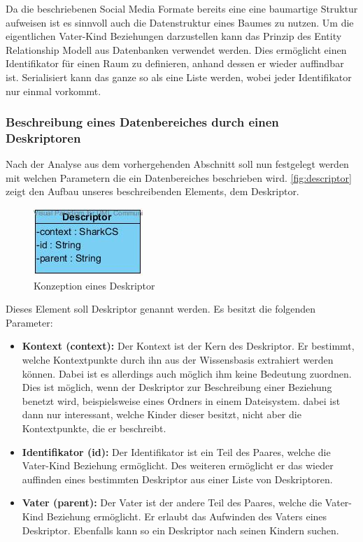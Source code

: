 \documentclass[a4paper]{article}
\begin{document}
	Da die beschriebenen Social Media Formate bereits eine eine baumartige Struktur
	aufweisen ist es sinnvoll auch die Datenstruktur eines Baumes zu nutzen. Um
	die eigentlichen Vater-Kind Beziehungen darzustellen kann das Prinzip des
	Entity Relationship Modell aus Datenbanken verwendet werden. Dies ermöglicht
	einen Identifikator für einen Raum zu definieren, anhand dessen er wieder
	auffindbar ist. Serialisiert kann das ganze so als eine Liste werden, wobei
	jeder Identifikator nur einmal vorkommt.
	
	\subsubsection{Beschreibung eines Datenbereiches durch einen Deskriptoren}
	
	Nach der Analyse aus dem vorhergehenden Abschnitt soll nun festgelegt werden
	mit welchen Parametern die ein Datenbereiches beschrieben wird.
	\autoref{fig:descriptor} zeigt den Aufbau unseres beschreibenden Elements, dem
	Deskriptor.
	
	\begin{figure}[H] 
		\centerline{
			\includegraphics{../Bilder/descriptor.jpg}
		}
		\caption{Konzeption eines Deskriptor}
		\label{fig:descriptor}
	\end{figure}
	
	Dieses Element soll Deskriptor genannt werden. Es besitzt die folgenden
	Parameter:
	
	\begin{itemize}
		\item \textbf{Kontext (context):} Der Kontext ist der Kern des Deskriptor.
		Er bestimmt, welche Kontextpunkte durch ihn aus der Wissensbasis extrahiert
		werden können. Dabei ist es allerdings auch möglich ihm keine Bedeutung 
		zuordnen. Dies ist möglich, wenn der Deskriptor zur	Beschreibung einer
		Beziehung benetzt wird, beispielsweise eines Ordners in einem Dateisystem.
		dabei ist dann nur interessant, welche Kinder dieser besitzt, nicht aber
		die Kontextpunkte, die er beschreibt.
		\item \textbf{Identifikator (id):} Der Identifikator ist ein Teil des
		Paares, welche die Vater-Kind Beziehung ermöglicht. Des weiteren
		ermöglicht er das wieder auffinden eines bestimmten Deskriptor aus einer
		Liste von Deskriptoren.
		\item \textbf{Vater (parent):} Der Vater ist der andere Teil des Paares,
		welche die Vater-Kind Beziehung ermöglicht. Er erlaubt das Aufwinden des
		Vaters eines Deskriptor. Ebenfalls kann so ein Deskriptor nach seinen
		Kindern	suchen.
	\end{itemize} 	
	
\end{document}
